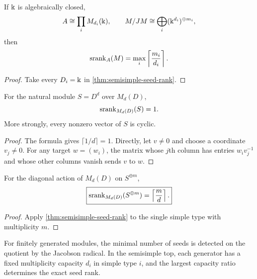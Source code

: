 \begin{corollary}
\label{cor:algebraically-closed-formula}
If $\Bbbk$ is algebraically closed,
\[
A\cong\prod_iM_{d_i}(\Bbbk),
\qquad
M/JM\cong\bigoplus_i(\Bbbk^{d_i})^{\oplus m_i},
\]
then
\[
\operatorname{srank}_A(M)=\max_i\left\lceil\frac{m_i}{d_i}\right\rceil.
\]
\end{corollary}

\begin{proof}
Take every $D_i=\Bbbk$ in \cref{thm:semisimple-seed-rank}.
\end{proof}

\begin{corollary}
\label{cor:full-matrix}
For the natural module $S=D^d$ over $M_d(D)$,
\[
\operatorname{srank}_{M_d(D)}(S)=1.
\]
More strongly, every nonzero vector of $S$ is cyclic.
\end{corollary}

\begin{proof}
The formula gives $\lceil1/d\rceil=1$.  Directly, let $v\neq0$ and choose a coordinate $v_j\neq0$.  For any target $w=(w_i)$, the matrix whose $j$th column has entries $w_iv_j^{-1}$ and whose other columns vanish sends $v$ to $w$.
\end{proof}

\begin{corollary}
\label{cor:multiplicity-obstruction}
For the diagonal action of $M_d(D)$ on $S^{\oplus m}$,
\[
\boxed{
\operatorname{srank}_{M_d(D)}(S^{\oplus m})
=
\left\lceil\frac{m}{d}\right\rceil.
}
\]
\end{corollary}

\begin{proof}
Apply \cref{thm:semisimple-seed-rank} to the single simple type with multiplicity $m$.
\end{proof}

\begin{sectionrecap}
For finitely generated modules, the minimal number of seeds is detected on the quotient by the Jacobson radical.  In the semisimple top, each generator has a fixed multiplicity capacity \(d_i\) in simple type \(i\), and the largest capacity ratio determines the exact seed rank.
\end{sectionrecap}

